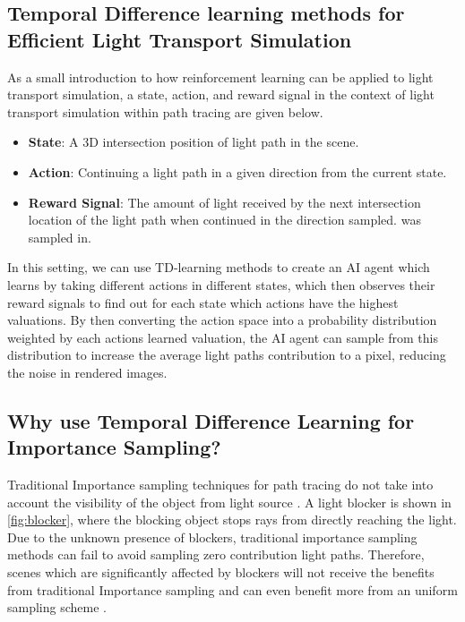 \documentclass[../dissertation.tex]{subfiles}
\begin{document}
\subsection{Temporal Difference learning methods for Efficient Light Transport Simulation}

 As a small introduction to how reinforcement learning can be applied to light transport simulation, a state, action, and reward signal in the context of light transport simulation within path tracing are given below.

\begin{itemize}

\item \textbf{State}: A 3D intersection position of light path in the scene.

\item \textbf{Action}: Continuing a light path in a given direction from the current 
state.

\item \textbf{Reward Signal}: The amount of light received by the next intersection location
of the light path when continued in the direction sampled.
was sampled in.

\end{itemize}

In this setting, we can use TD-learning methods to create an AI agent which learns by taking different actions in different states, which then observes their reward signals to find out for each state which actions have the highest valuations. By then converting the action space into a probability distribution weighted by each actions learned valuation, the AI agent can sample from this distribution to increase the average light paths contribution to a pixel, reducing the noise in rendered images. 

\subsection{Why use Temporal Difference Learning for Importance Sampling?}

Traditional Importance sampling techniques for path tracing do not take into account the visibility of the object from light source \cite{dahm2017learning}. A light blocker is shown in \ref{fig:blocker}, where the  blocking object stops rays from directly reaching the light. Due to the unknown presence of blockers, traditional importance sampling methods can fail to avoid sampling zero contribution light paths. Therefore, scenes which are significantly affected by blockers will not receive the benefits from traditional Importance sampling and can even benefit more from an uniform sampling scheme \cite{ramamoorthi2012theory}.
\end{document}
